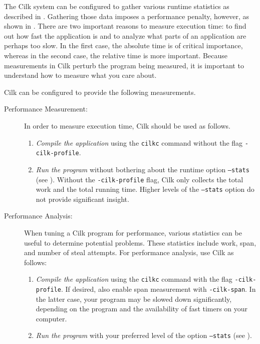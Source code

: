 The Cilk system can be configured to gather various runtime statistics
as described in .  Gathering those data imposes a
performance penalty, however, as shown in .  There are
two important reasons to measure execution time: to find out how fast
the application is and to analyze what parts of an application are
perhaps too slow.  In the first case, the absolute time is of critical
importance, whereas in the second case, the relative time is more
important.  Because measurements in Cilk perturb the program being
measured, it is important to understand how to measure what you care
about.

Cilk can be configured to provide the following measurements.
\begin{description}

\item[Performance Measurement:] In order to measure execution time,
Cilk should be used as follows.
\begin{enumerate}
\item \emph{Compile the application} using the \texttt{cilkc}
  command without the flag \texttt{-cilk-profile}.
\item \emph{Run the program} without bothering about the runtime
  option \texttt{--stats} (see ).  Without the
  \texttt{-cilk-profile} flag, Cilk only collects the total work and
  the total running time.  Higher levels of the \texttt{--stats}
  option do not provide significant insight.
\end{enumerate}

\item[Performance Analysis:] When tuning a Cilk program for
  performance, various statistics can be useful to determine potential
  problems.  These statistics include work, span, and number of steal
  attempts.  For performance analysis, use Cilk as follows:

\begin{enumerate}
\item \emph{Compile the application} using the \texttt{cilkc} command
  with the flag \texttt{-cilk-profile}.  If desired, also enable
  span measurement with \texttt{-cilk-span}.  In the
  latter case, your program may be slowed down significantly,
  depending on the program and the availability of fast timers on your
  computer.

  \item \emph{Run the program} with your preferred level
    of the option \texttt{--stats} (see ).
  \end{enumerate}
\end{description}

